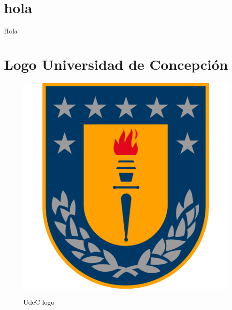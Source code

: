 \documentclass[../Main.tex]{subfiles}
\begin{document}
\renewcommand{\thesection}{A\arabic{section}}
\renewcommand{\thetable}{A\arabic{section}.\arabic{table}}




\section{hola}
Hola

\section{Logo Universidad de Concepción}
\begin{figure}[h]
    \centering
\caption{UdeC logo}
    \includegraphics[width=0.2\columnwidth]{Images/escudo_udec.png}
    \label{fig_logo2}
\end{figure}


\biblio %
\end{document}
